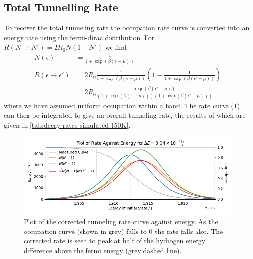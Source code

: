 \subsection{Total Tunnelling Rate}
To recover the total tunneling
rate the occupation rate curve
is converted into an
energy rate using the
fermi-dirac distribution.
For \(R(N\rightarrow{}N') = 2R_0N(1-N')\)
we find
\begin{align}
    N(\epsilon)                         & = \frac{1}{1 + \exp{(\beta(\epsilon - \mu))}}                                                                         \\
    R(\epsilon \rightarrow{} \epsilon') & = 2R_0 \frac{1}{1 + \exp{(\beta(\epsilon - \mu))}}(1- \frac{1}{1 + \exp{(\beta(\epsilon' - \mu))}})                   \\
                                        & = 2R_0 \frac{\exp{(\beta(\epsilon' - \mu))}}{(1 + \exp{(\beta(\epsilon - \mu))})(1 + \exp{(\beta(\epsilon' - \mu))})}
\end{align}
where we have assumed uniform
occupation within a band.
The rate curve
(\cref{fig:tunneling rate against energy})
can then be
integrated to give an
overall tunneling rate, the results of
which are given in \cref{tab:decay rates simulated 150K}.
\begin{figure}[htbp]
    \centering
    \includegraphics[width =0.9 \linewidth]{Figures/Simulation/Corrected Decay Rates.png}
    \caption{Plot of the corrected
        tunneling rate curve against
        energy. As the occupation curve
        (shown in grey) falls to 0
        the rate falls also. The corrected
        rate is seen to peak at half of the hydrogen
        energy difference above the fermi
        energy (grey dashed line).
    }\label{fig:tunneling rate against energy}
\end{figure}

